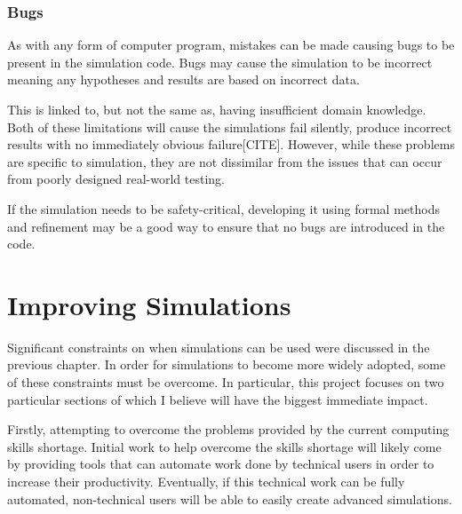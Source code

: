 \documentclass{UoYCSproject}
\begin{document}

\subsubsection{Bugs}
As with any form of computer program, mistakes can be made causing bugs to be present in the simulation code. Bugs may cause the simulation to be incorrect meaning any hypotheses and results are based on incorrect data.

This is linked to, but not the same as, having insufficient domain knowledge. Both of these limitations will cause the simulations fail silently, produce incorrect results with no immediately obvious failure[CITE].
However, while these problems are specific to simulation, they are not dissimilar from the issues that can occur from poorly designed real-world testing.

If the simulation needs to be safety-critical, developing it using formal methods and refinement may be a good way to ensure that no bugs are introduced in the code.

\section{Improving Simulations}
\label{improvements}
Significant constraints on when simulations can be used were discussed in the previous chapter. In order for simulations to become more widely adopted, some of these constraints must be overcome. 
In particular, this project focuses on two particular sections of which I believe will have the biggest immediate impact.

Firstly, attempting to overcome the problems provided by the current computing skills shortage. 
Initial work to help overcome the skills shortage will likely come by providing tools that can automate work done by technical users in order to increase their productivity.
Eventually, if this technical work can be fully automated, non-technical users will be able to easily create advanced simulations.
\end{document}
